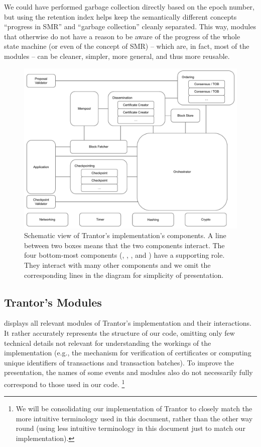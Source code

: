 \documentclass{article}
\begin{document}
We could have performed garbage collection directly based on the epoch number,
but using the retention index helps keep the semantically different concepts ``progress in SMR'' and ``garbage collection'' cleanly separated.
This way, modules that otherwise do not have a reason to be aware of the progress of the whole state machine (or even of the concept of SMR)
-- which are, in fact, most of the modules --
can be cleaner, simpler, more general, and thus more reusable.

\begin{figure}[ht]
    \centering
    \includegraphics[width=\textwidth]{figures/implementation-diagram}
    \caption{Schematic view of Trantor's implementation's components.
    A line between two boxes means that the two components interact.
    The four bottom-most components (, , , and ) have a supporting role.
    They interact with many other components and we omit the corresponding lines in the diagram for simplicity of presentation.}
    \label{fig:implementation-diagram}
\end{figure}

\subsection{Trantor's Modules}

 displays all relevant modules of Trantor's implementation and their interactions.
It rather accurately represents the structure of our code, omitting only few technical details not relevant for understanding the workings of the implementation
(e.g., the mechanism for verification of certificates or computing unique identifiers of transactions and transaction batches).
To improve the presentation, the names of some events and modules also do not necessarily fully correspond to those used in our code.%
\footnote{We will be consolidating our implementation of Trantor to closely match the more intuitive terminology used in this document,
rather than the other way round (using less intuitive terminology in this document just to match our implementation).}
\end{document}
